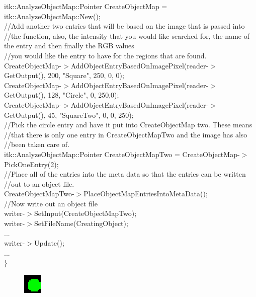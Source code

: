 \documentclass{InsightArticle}
\begin{document}
\begin{itemize}
{itk::AnalyzeObjectMap::Pointer CreateObjectMap = itk::AnalyzeObjectMap::New();\\

//Add another two entries that will be based on the image that is passed into \\
//the function, also, the intensity that you would like searched for, the name of the entry and then finally the RGB values\\
//you would like the entry to have for the regions that are found.\\
CreateObjectMap-$>$AddObjectEntryBasedOnImagePixel(reader-$>$GetOutput(), 200, "Square", 250, 0, 0);\\
CreateObjectMap-$>$AddObjectEntryBasedOnImagePixel(reader-$>$GetOutput(), 128, "Circle", 0, 250,0);\\
CreateObjectMap-$>$AddObjectEntryBasedOnImagePixel(reader-$>$GetOutput(), 45,  "SquareTwo", 0, 0, 250);\\

//Pick the circle entry and have it put into CreateObjectMap two.  These means
  //that there is only one entry in CreateObjectMapTwo and the image has also\\
//been taken care of.\\
itk::AnalyzeObjectMap::Pointer CreateObjectMapTwo = CreateObjectMap-$>$PickOneEntry(2);\\

//Place all of the entries into the meta data so that the entries can be written\\
//out to an object file.\\
CreateObjectMapTwo-$>$PlaceObjectMapEntriesIntoMetaData();\\

//Now write out an object file\\
writer-$>$SetInput(CreateObjectMapTwo);\\
writer-$>$SetFileName(CreatingObject);\\
...\\
writer-$>$Update();\\
...\\
\}
}
\begin{figure}[h]
\center
\includegraphics[width=.14\textwidth]{circle.eps}
\label{fig:StreamingConceptDiagram}
\end{figure}


\end{itemize}
\end{document}
